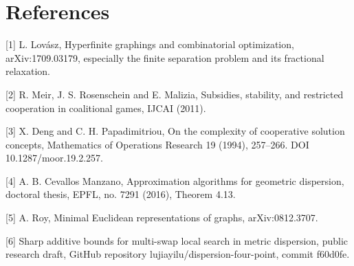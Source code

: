 \documentclass[11pt]{article}
\begin{document}
\section*{References}
[1] L. Lovász, Hyperfinite graphings and combinatorial optimization, arXiv:1709.03179, especially the finite separation problem and its fractional relaxation.

[2] R. Meir, J. S. Rosenschein and E. Malizia, Subsidies, stability, and restricted cooperation in coalitional games, IJCAI (2011).

[3] X. Deng and C. H. Papadimitriou, On the complexity of cooperative solution concepts, Mathematics of Operations Research 19 (1994), 257--266. DOI 10.1287/moor.19.2.257.

[4] A. B. Cevallos Manzano, Approximation algorithms for geometric dispersion, doctoral thesis, EPFL, no. 7291 (2016), Theorem 4.13.

[5] A. Roy, Minimal Euclidean representations of graphs, arXiv:0812.3707.

[6] Sharp additive bounds for multi-swap local search in metric dispersion, public research draft, GitHub repository lujiayilu/dispersion-four-point, commit f60d0fe.
\end{document}
